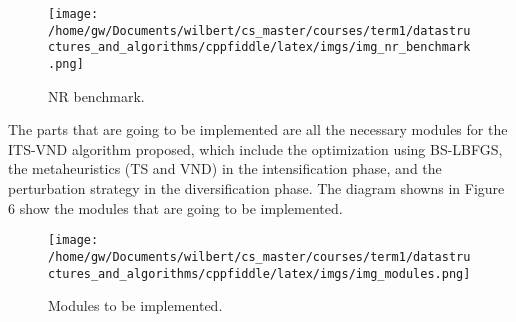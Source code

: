 \documentclass{article}
\begin{document}
\begin{figure}[H]
	\centering
	\texttt{[image: /home/gw/Documents/wilbert/cs\_master/courses/term1/datastructures\_and\_algorithms/cppfiddle/latex/imgs/img\_nr\_benchmark.png]}
	\caption{NR benchmark.}
	\label{fig:img_pecc}
\end{figure}


The parts that are going to be implemented are all the necessary modules for the ITS-VND algorithm proposed, which include the optimization using BS-LBFGS, the metaheuristics (TS and VND) in the intensification phase, and the perturbation strategy in the diversification phase. The diagram showns in Figure 6 show the modules that are going to be implemented.\\


\begin{figure}[H]
	\centering
	\texttt{[image: /home/gw/Documents/wilbert/cs\_master/courses/term1/datastructures\_and\_algorithms/cppfiddle/latex/imgs/img\_modules.png]}
	\caption{Modules to be implemented.}
	\label{fig:img_pecc}
\end{figure}

\end{document}
